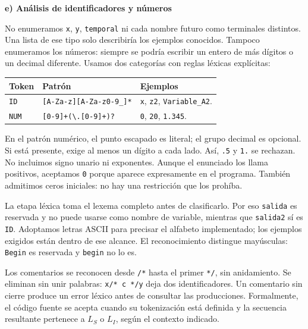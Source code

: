\documentclass[11pt,letterpaper]{article}
\newcommand{\cod}[1]{\texttt{#1}}
\newcommand{\subtitulo}[1]{\vspace{5pt}\textbf{#1}\par\nopagebreak[4]}
\newcommand{\cab}[1]{\rowcolor{cabecera}#1}
\begin{document}
\subtitulo{e) Análisis de identificadores y números}
No enumeramos \cod{x}, \cod{y}, \cod{temporal} ni cada nombre futuro como terminales distintos. Una lista de ese tipo solo describiría los ejemplos conocidos. Tampoco enumeramos los números: siempre se podría escribir un entero de más dígitos o un decimal diferente. Usamos dos categorías con reglas léxicas explícitas:
\begin{center}
\begin{tabularx}{\textwidth}{|p{1.4cm}|p{6.4cm}|X|}\hline
\cab{\textbf{Token}&\textbf{Patrón}&\textbf{Ejemplos}}\\\hline
\cod{ID}&\cod{[A-Za-z][A-Za-z0-9\_]*}&\cod{x}, \cod{z2}, \cod{Variable\_A2}.\\\hline
\cod{NUM}&\cod{[0-9]+(\textbackslash.[0-9]+)?}&\cod{0}, \cod{20}, \cod{1.345}.\\\hline
\end{tabularx}\end{center}
En el patrón numérico, el punto escapado es literal; el grupo decimal es opcional. Si está presente, exige al menos un dígito a cada lado. Así, \cod{.5} y \cod{1.} se rechazan. No incluimos signo unario ni exponentes. Aunque el enunciado los llama positivos, aceptamos \cod{0} porque aparece expresamente en el programa. También admitimos ceros iniciales: no hay una restricción que los prohíba.

La etapa léxica toma el lexema completo antes de clasificarlo. Por eso \cod{salida} es reservada y no puede usarse como nombre de variable, mientras que \cod{salida2} sí es \cod{ID}. Adoptamos letras ASCII para precisar el alfabeto implementado; los ejemplos exigidos están dentro de ese alcance. El reconocimiento distingue mayúsculas: \cod{Begin} es reservada y \cod{begin} no lo es.

Los comentarios se reconocen desde \cod{/*} hasta el primer \cod{*/}, sin anidamiento. Se eliminan sin unir palabras: \cod{x/* c */y} deja dos identificadores. Un comentario sin cierre produce un error léxico antes de consultar las producciones. Formalmente, el código fuente se acepta cuando su tokenización está definida y la secuencia resultante pertenece a $L_S$ o $L_I$, según el contexto indicado.

\newpage
\end{document}

